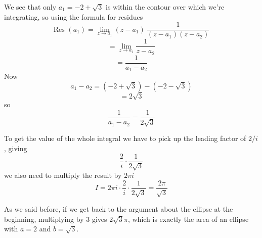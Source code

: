 \documentclass[11pt, oneside]{article}
\begin{document}
We see that only $a_1 = -2 + \sqrt{3}$ is within the contour over which we're integrating, so using the formula for residues
\[ \text{Res }(a_1) = \lim_{z \rightarrow a_1} (z - a_1) \ \frac{1}{(z - a_1)(z - a_2)} \]
\[ = \lim_{z \rightarrow a_1} \frac{1}{z - a_2} \]
\[ = \frac{1}{a_1 - a_2} \]
Now
\[ a_1 - a_2 = (-2 + \sqrt{3} ) - (-2 - \sqrt{3} ) \]
\[ = 2 \sqrt{3} \]
so
\[ \frac{1}{a_1 - a_2} = \frac{1}{2 \sqrt{3}} \]

To get the value of the whole integral we have to pick up the leading factor of $2/i$, giving
\[ \frac{2}{i} \cdot \frac{1}{2 \sqrt{3}} \]
we also need to multiply the result by $2 \pi i$
\[ I = 2 \pi i \cdot \frac{2}{i} \cdot \frac{1}{2 \sqrt{3}} = \frac{2 \pi}{\sqrt{3}} \]

As we said before, if we get back to the argument about the ellipse at the beginning, multiplying by $3$ gives $2 \sqrt{3} \pi$, which is exactly the area of an ellipse with $a = 2$ and $b = \sqrt{3}$.
\end{document}
